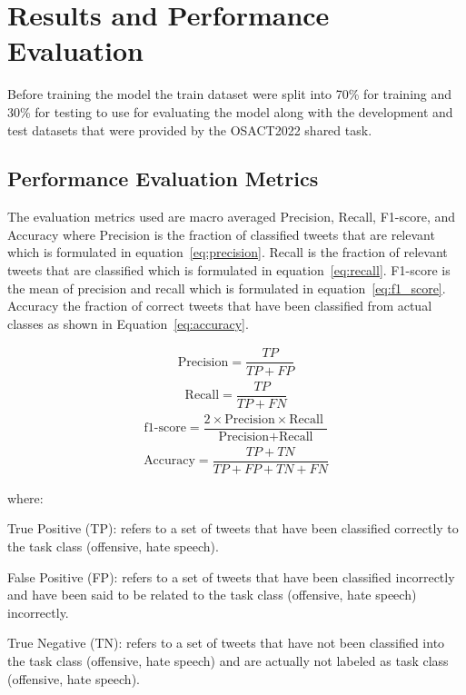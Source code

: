 \documentclass[conference]{IEEEtran}
\begin{document}
\section{Results and Performance Evaluation}
Before training the model the train dataset were split into 70\% for training and 30\% for testing to use for evaluating the model along with the development and test datasets that were provided by the OSACT2022 shared task.


\subsection{Performance Evaluation Metrics}
The evaluation metrics used are macro averaged Precision, Recall, F1-score, and Accuracy where Precision is the fraction of classified tweets that are relevant which is formulated in equation~\ref{eq:precision}. Recall is the fraction of relevant tweets that are classified which is formulated in equation~\ref{eq:recall}. F1-score is the mean of precision and recall which is formulated in equation~\ref{eq:f1_score}. Accuracy the fraction of correct tweets that have been classified from actual classes as shown in Equation~\ref{eq:accuracy}.

\begin{align}\label{eq:precision}
	\text{Precision} = \dfrac{TP}{TP + FP}
\end{align}
\begin{align}\label{eq:recall}
	\text{Recall}=\dfrac{TP}{TP + FN}
\end{align}
\begin{align}\label{eq:f1_score}
	\text{f1-score}=\dfrac{2 \times \text{Precision} \times \text{Recall }}{\text{Precision} + \text{Recall} }
\end{align}
\begin{align}\label{eq:accuracy}
	\text{Accuracy} = \dfrac{TP + TN}{TP + FP + TN + FN}
\end{align}

where:


True Positive (TP): refers to a set of tweets that have been classified correctly to the task class (offensive, hate speech).


False Positive (FP): refers to a set of tweets that have been classified incorrectly and have been said to be related to the task class (offensive, hate speech) incorrectly.


True Negative (TN): refers to a set of tweets that have not been classified into the task class (offensive, hate speech) and are actually not labeled as task class (offensive, hate speech).
\end{document}
